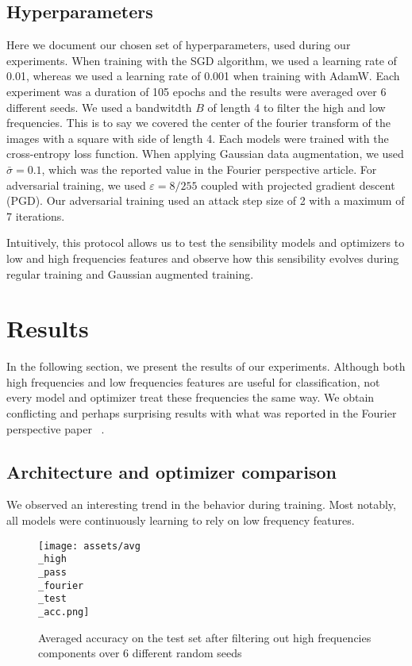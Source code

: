 \documentclass{article} \author{Simon Théorêt}
\begin{document}
\subsection*{Hyperparameters}
Here we document our chosen set of hyperparameters, used during our
experiments. When training with the SGD algorithm, we used a learning
rate of 0.01, whereas we used a learning rate of 0.001 when training
with AdamW. Each experiment was a duration of 105 epochs and the
results were averaged over 6 different seeds. We used a bandwitdth $B$
of length 4 to filter the high and low frequencies. This is to say we
covered the center of the fourier transform of the images with a
square with side of length 4. Each models were trained with the
cross-entropy loss function. When applying Gaussian data augmentation,
we used $\bar{\sigma} = 0.1$, which was the reported value in the
Fourier perspective article. For adversarial training, we used
$\varepsilon = 8/255$ coupled with projected gradient descent
(PGD). Our adversarial training used an attack step size of 2 with a
maximum of 7 iterations.

Intuitively, this protocol allows us to test the sensibility models
and optimizers to low and high frequencies features and observe how
this sensibility evolves during regular training and Gaussian
augmented training.

\section{Results}
In the following section, we present the results of our
experiments. Although both high frequencies and low frequencies
features are useful for classification, not every model and optimizer
treat these frequencies the same way. We obtain conflicting and
perhaps surprising results with what was reported in the Fourier
perspective paper ~\citep{yin2020fourier}.

\subsection{Architecture and optimizer comparison}
We observed an interesting trend in the behavior during training. Most
notably, all models were continuously learning to rely on low
frequency features. 

\begin{figure}[h]
  \centering
  \texttt{[image: assets/avg\\\_high\\\_pass\\\_fourier\\\_test\\\_acc.png]}
  \caption{Averaged accuracy on the test set after filtering out high frequencies
    components over 6 different random seeds}
	\label{fig:lowerror}
\end{figure}
\end{document}
